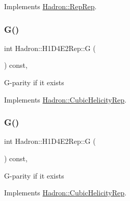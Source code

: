 Implements \mbox{\hyperlink{structHadron_1_1RepRep_a92c8802e5ed7afd7da43ccfd5b7cd92b}{Hadron\+::\+Rep\+Rep}}.

\mbox{\label{structHadron_1_1H1D4E2Rep_a89812641dc6e1a2786c442f6bc8775d7}} 
\subsubsection{\texorpdfstring{G()}{G()}\hspace{0.1cm}{\footnotesize\ttfamily [1/3]}}
{\footnotesize\ttfamily int Hadron\+::\+H1\+D4\+E2\+Rep\+::G (\begin{DoxyParamCaption}{ }\end{DoxyParamCaption}) const\hspace{0.3cm}{\ttfamily [inline]}, {\ttfamily [virtual]}}

G-\/parity if it exists 

Implements \mbox{\hyperlink{structHadron_1_1CubicHelicityRep_a50689f42be1e6170aa8cf6ad0597018b}{Hadron\+::\+Cubic\+Helicity\+Rep}}.

\mbox{\label{structHadron_1_1H1D4E2Rep_a89812641dc6e1a2786c442f6bc8775d7}} 
\subsubsection{\texorpdfstring{G()}{G()}\hspace{0.1cm}{\footnotesize\ttfamily [2/3]}}
{\footnotesize\ttfamily int Hadron\+::\+H1\+D4\+E2\+Rep\+::G (\begin{DoxyParamCaption}{ }\end{DoxyParamCaption}) const\hspace{0.3cm}{\ttfamily [inline]}, {\ttfamily [virtual]}}

G-\/parity if it exists 

Implements \mbox{\hyperlink{structHadron_1_1CubicHelicityRep_a50689f42be1e6170aa8cf6ad0597018b}{Hadron\+::\+Cubic\+Helicity\+Rep}}.

\mbox{\label{structHadron_1_1H1D4E2Rep_a89812641dc6e1a2786c442f6bc8775d7}} 
